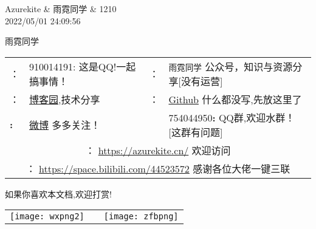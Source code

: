 \begin{flushright}
	Azurekite \& 雨霓同学 \& 1210 \\
	2022/05/01 24:09:56
\end{flushright}
{\large
	   雨霓同学\\
}
\vspace{-2pt}
\begin{sBox}
	\begin{center}
		\noindent\footnotesize\begin{tabular}{@{}l@{ }l|l@{ }l@{}}
			\textcolor[RGB]{18,183,245}{\faQq}：&910014191:  这是QQ!一起搞事情！\faSendO   & \textcolor[RGB]{9,187,7}{\faWeixin}：&\verb|雨霓同学|  公众号，知识与资源分享[没有运营]\faSendO \\
			\textcolor[RGB]{0,194,255}{\faInternetExplorer}：& \href{https://www.cnblogs.com/1210x1184/}{ 博客园},技术分享  & {\textcolor[RGB]{39,165,188}{\faGithubAlt}}：& \href{https://github.com/Azure1210/}{Github}  什么都没写,先放这里了 \\
			\textcolor[RGB]{18,183,245}{\faWeibo}\textbf{:} & \href{https://weibo.com/u/5713129191}{微博} \faSendO 多多关注！ &\textcolor[RGB]{18,183,245}{\faUsers} &754044950\textbf{:}  QQ群,欢迎水群！[这群有问题]\faSendO \\
			\multicolumn{4}{c}{\textcolor[RGB]{252,74,35}{\faSkyatlas}： \url{https://azurekite.cn/} \faSendO 欢迎访问\faSendO}
		\\[1pt]
			\multicolumn{4}{c}{\textcolor[RGB]{252,74,35}{\faTv}： \url{https://space.bilibili.com/44523572} \faSendO 感谢各位大佬一键三联\faSendO}\\ 
		\end{tabular}
	\end{center}
\begin{center}	
如果你喜欢本文档,欢迎打赏! \\[1pt]
	\begin{tabular}{ccc}
\texttt{[image: wxpng2]}   & \qquad  \qquad &
\texttt{[image: zfbpng]}  
	\end{tabular}
\end{center}
\end{sBox}

